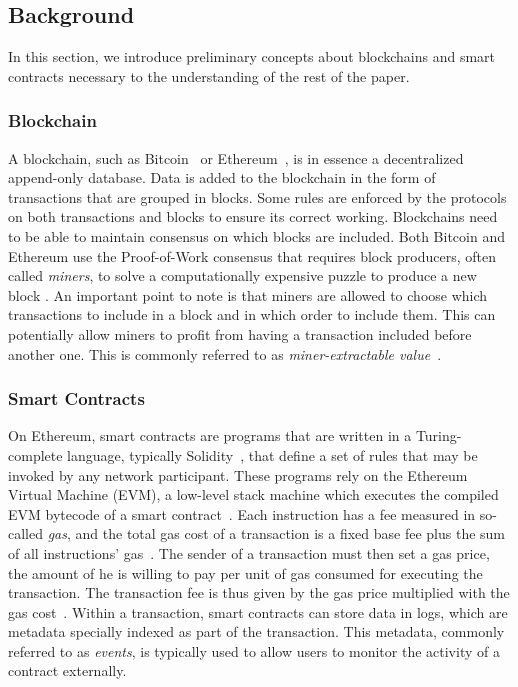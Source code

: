 \subsection{Background}
\label{sec:5b:background}
In this section, we introduce preliminary concepts about blockchains and smart contracts necessary to the understanding of the rest of the paper.

\subsubsection{Blockchain}

A blockchain, such as Bitcoin~\cite{Nakamoto} or Ethereum~\cite{wood2014ethereum}, is in essence a decentralized append-only database.
Data is added to the blockchain in the form of transactions that are grouped in blocks.
Some rules are enforced by the protocols on both transactions and blocks to ensure its correct working.
Blockchains need to be able to maintain consensus on which blocks are included.
Both Bitcoin and Ethereum use the Proof-of-Work consensus that requires block producers, often called \emph{miners}, to solve a computationally expensive puzzle to produce a new block \cite{Perez2020c}.
An important point to note is that miners are allowed to choose which transactions to include in a block and in which order to include them.
This can potentially allow miners to profit from having a transaction included before another one.
This is commonly referred to as \emph{miner-extractable value}~\cite{daian2020flash}.

\subsubsection{Smart Contracts}
On Ethereum, smart contracts are programs that are written in a Turing-complete language, typically Solidity~\cite{docs:solidity}, that define a set of rules that may be invoked by any network participant. 
These programs rely on the Ethereum Virtual Machine (EVM), a low-level stack machine which executes the compiled EVM bytecode of a smart contract~\cite{wood2014ethereum}.
Each instruction has a fee measured in so-called \textit{gas}, and the total gas cost of a transaction is a fixed base fee plus the sum of all instructions' gas~\cite{albert2020gasol,Perez2020f}.
The sender of a transaction must then set a gas price, the amount of  he is willing to pay per unit of gas consumed for executing the transaction.
The transaction fee is thus given by the gas price multiplied with the gas cost~\cite{werner2020step,pierro2019influence}.
Within a transaction, smart contracts can store data in logs, which are metadata specially indexed as part of the transaction.
This metadata, commonly referred to as \textit{events}, is typically used to allow users to monitor the activity of a contract externally.

